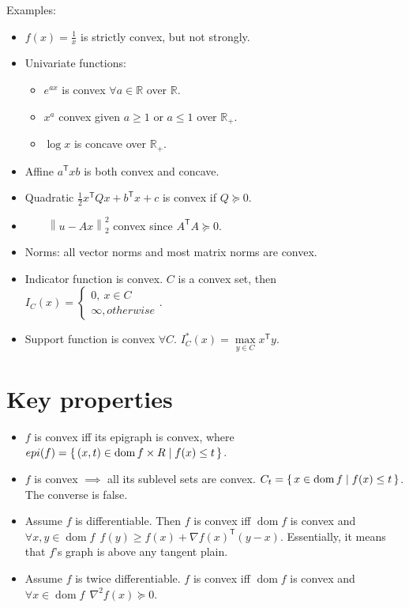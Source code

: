 \documentclass[10pt]{article}
\newcommand{\R}{\mathbb{R}}
\newcommand{\norm}[1]{\left\lVert #1 \right\rVert}
\newcommand{\trans}[1]{{#1}^\mathsf{T}}
\DeclareMathOperator*{\dom}{dom}
\begin{document}
Examples:
\begin{itemize}
  \item $f(x) = \frac 1 x$ is strictly convex, but not strongly.
  \item Univariate functions:
    \begin{itemize}
      \item $e^{ax}$ is convex $\forall a \in \R$ over $\R$.
      \item $x^a$ convex given $a \geq 1$ or $a \leq 1$ over $\R_+$.
      \item $\log x$ is concave over $\R_+$.
    \end{itemize}
  \item Affine $\trans a x b$ is both convex and concave.
  \item Quadratic $\frac 1 2 \trans x Q x + \trans b x + c$ is convex if $Q \succeq 0$.
  \item \ \ \ \ $\norm {u - A x}_2^2$ convex since $\trans A A \succeq 0$.
  \item Norms: all vector norms and most matrix norms are convex.
  \item Indicator function is convex. $C$ is a convex set, then
    $I_C(x) = \begin{cases}
                0,\ x \in C \\
                \infty, otherwise
              \end{cases}$.
  \item Support function is convex $\forall C$. $I_C^*(x) = \max\limits_{y \in C} \trans x y$.
\end{itemize}

\section{Key properties}
\begin{itemize}
  \item $f$ is convex iff its epigraph is convex, where
    $epi(f) = \set{ (x,t) \in \dom f \times R | f(x) \leq t}$.
  \item $f$ is convex $\implies$ all its sublevel sets are convex. $C_t = \set{x \in \dom f | f(x) \leq t}$.
    The converse is false.
  \item Assume $f$ is differentiable. Then $f$ is convex iff $\dom f$ is convex and
    $\forall x,y \in \dom f\ \ f(y) \geq f(x) + \nabla \trans{f(x)} (y-x)$.
    Essentially, it means that $f$'s graph is above any tangent plain.
  \item Assume $f$ is twice differentiable.
    $f$ is convex iff $\dom f$ is convex and $\forall x \in \dom f\ \ \nabla^2 f(x) \succeq 0$.
\end{itemize}
\end{document}
